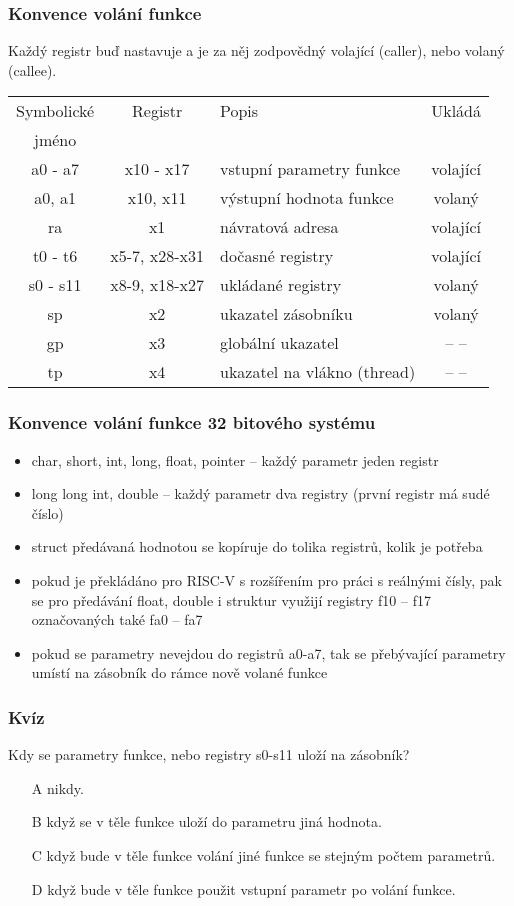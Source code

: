 \documentclass{beamer}
\begin{document}
\begin{frame}
\frametitle{Konvence volání funkce}

Každý registr buď nastavuje a je za něj zodpovědný volající (caller), nebo volaný (callee).

\begin{tabular}{|c|c|p{4cm}|c|}\hline
Symbolické & Registr & Popis & Ukládá \\
   jméno   &         &       &        \\ \hline
a0 - a7 & x10 - x17 & vstupní parametry funkce & volající \\\hline
a0, a1 & x10, x11 & výstupní hodnota funkce & volaný \\\hline
ra & x1 & návratová adresa & volající \\\hline
t0 - t6 & x5-7, x28-x31 & dočasné registry & volající\\\hline
s0 - s11 & x8-9, x18-x27 & ukládané registry & volaný\\\hline
sp & x2 & ukazatel zásobníku & volaný\\\hline
gp & x3 & globální ukazatel & -- --\\\hline
tp & x4 & ukazatel na vlákno (thread) & -- --\\\hline
\end{tabular}
\end{frame}


\begin{frame}
\frametitle{Konvence volání funkce 32 bitového systému}

\begin{itemize}
 \item char, short, int, long, float, pointer -- každý parametr jeden registr
 \item long long int, double -- každý parametr dva registry (první registr má sudé číslo)
 \item struct předávaná hodnotou se kopíruje do tolika registrů, kolik je potřeba
 \item pokud je překládáno pro RISC-V s rozšířením pro práci s reálnými čísly, pak se pro předávání float, double i struktur využijí registry f10 -- f17 označovaných také fa0 -- fa7
 \item pokud se parametry nevejdou do registrů a0-a7, tak se přebývající parametry umístí na zásobník do rámce nově volané funkce
\end{itemize}
\end{frame}


\begin{frame}
\frametitle{Kvíz}

Kdy se parametry funkce, nebo registry s0-s11 uloží na zásobník?
\begin{itemize}
 \item[A] nikdy.
 \item[B] když se v těle funkce uloží do parametru jiná hodnota.
 \item[C] když bude v těle funkce volání jiné funkce se stejným počtem parametrů.
 \item[D] když bude v těle funkce použit vstupní parametr po volání funkce.
\end{itemize}
\end{frame}
\end{document}
